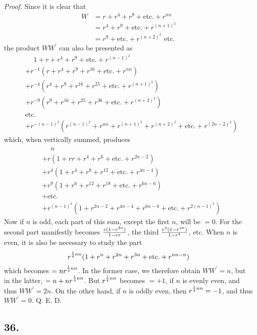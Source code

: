 \documentclass[twoside,12pt]{memoir}
\let\oldfrac\frac
\def\frac#1#2{\mathchoice{\tfrac{#1}{#2}}{\oldfrac{#1}{#2}}{\genfrac{}{}{}{2}{#1}{#2\mathstrut}}{\genfrac{}{}{}{3}{#1}{#2\mathstrut}}}
\begin{document}
\textit{Proof.} Since it is clear that
\[\begin{aligned}
W & =r+r^{4}+r^{9}+\text{etc{.}}+r^{n n} \\
& =r^{4}+r^{9}+\text{etc{.}}+r^{(n+1)^{2}} \\
& =r^{9}+\text{etc{.}}+r^{(n+2)^{2}} \text{ etc{.}}
\end{aligned}\]
the product \(W {W}^{\prime}\) can also be presented as
\[\begin{aligned}
&\phantom{ +, } 1+r+r^{4}+r^{9}+\text{etc{.}}+r^{(n-1)^{2}} \\
&+ r^{-1}(r+r^{4}+r^{9}+r^{16}+\text{etc{.}}+r^{n n}) \\
&+ r^{-4}(r^{4}+r^{9}+r^{16}+r^{25}+\text{etc{.}}+r^{(n+1)^{2}}) \\
&+ r^{-9}(r^{9}+r^{16}+r^{25}+r^{36}+\text{etc{.}}+r^{(n+2)^{2}}) \\
&\text{etc{.}} \\
&+ r^{-(n-1)^{2}}(r^{(n-1)^{2}}+r^{n n}+r^{(n+1)^{2}}+r^{(n+2)^{2}}+\text{etc{.}}+r^{(2 n-2)^{2}})
\end{aligned}\]
which, when vertically summed, produces
\[\begin{aligned}
&\phantom{+}n \\
&+r(1+r r+r^{4}+r^{6}+\text{etc{.}}+r^{2 n-2}) \\
&+r^{4}(1+r^{4}+r^{8}+r^{12}+\text{etc{.}}+r^{4 n-4}) \\
&+r^{9}(1+r^{6}+r^{12}+r^{18}+\text{etc{.}}+r^{6 n-6}) \\
&+\text{etc{.}} \\
&+r^{(n-1)^{2}}(1+r^{2 n-2}+r^{4 n-4}+r^{6 n-6}+\text{etc{.}}+r^{2(n-1)^{2}})
\end{aligned}\]
Now if \(n\) is odd, each part of this sum, except the first \(n\), will be \(=0\).  For the second part manifestly becomes \(\frac{r(1-r^{2 n})}{1-r r}\), the third \(\frac{r^{4}(1-r^{4 n})}{1-r^{4}}\), etc{.}  When \(n\) is even, it is also be necessary to study the part\pagebreak%
\[r^{\frac{1}{4} n n}(1+r^{n}+r^{2 n}+r^{3 n}+\text{etc{.}}+r^{n n-n})\]
which becomes \(=n r^{\frac{1}{4} n n}\). In the former case, we therefore obtain \(W W^{\prime}=n\), but in the latter, \(=n+n r^{\frac{1}{4} n n}\).  But \(r^{\frac{1}{4} n n}\) becomes \(=+1\), if \(n\) is evenly even, and thus \(W W^{\prime}=2 n\). On the other hand, if \(n\) is oddly even, then \(r^{\frac{1}{4} n n}=-1\), and thus \(W W^{\prime}=0\). Q. E. D.

\subsection*{36.}
\end{document}
